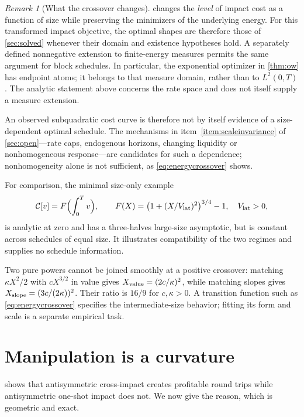 \documentclass[11pt]{article}
\numberwithin{equation}{section}
\theoremstyle{definition}
\theoremstyle{remark}
\newtheorem{remark}[theorem]{Remark}
\theoremstyle{definition}
\begin{document}
\begin{remark}[What the crossover changes]\label{rem:tworegimes}
 changes the \emph{level} of impact cost as a function
of size while preserving the minimizers of the underlying energy. For this
transformed impact objective, the optimal shapes are therefore those of
\cref{sec:solved} whenever their domain and existence hypotheses hold.
A separately defined nonnegative extension to finite-energy measures permits
the same argument for block schedules. In particular, the exponential
optimizer in \cref{thm:ow} has endpoint atoms; it belongs to that measure
domain, rather than to $L^2(0,T)$. The analytic statement above concerns the
rate space and does not itself supply a measure extension.

An observed subquadratic cost curve is therefore not by itself evidence of a
size-dependent optimal schedule. The mechanisms in item~\ref{item:scaleinvariance}
of \cref{sec:open}---rate caps, endogenous horizons, changing liquidity or
nonhomogeneous response---are candidates for such a dependence; nonhomogeneity
alone is not sufficient, as \eqref{eq:energycrossover} shows.

For comparison, the minimal size-only example
\begin{equation}\label{eq:crossoverexample}
 \mathcal C[v]=F\Bigl(\int_0^Tv\Bigr),\qquad
 F(X)=\bigl(1+(X/V_{\rm lat})^2\bigr)^{3/4}-1,\quad V_{\rm lat}>0,
\end{equation}
is analytic at zero and has a three-halves large-size asymptotic, but is
constant across schedules of equal size. It illustrates compatibility of the
two regimes and supplies no schedule information.

Two pure powers cannot be joined smoothly at a positive crossover:
matching $\kappa X^2/2$ with $cX^{3/2}$ in value gives
$X_{\rm value}=(2c/\kappa)^2$, while matching slopes gives
$X_{\rm slope}=(3c/(2\kappa))^2$. Their ratio is $16/9$ for $c,\kappa>0$.
A transition function such as \eqref{eq:energycrossover} specifies the
intermediate-size behavior; fitting its form and scale is a separate
empirical task.
\end{remark}

\section{Manipulation is a curvature}\label{sec:curvature}

 shows that antisymmetric cross-impact creates profitable round
trips while antisymmetric one-shot impact does not. We now give the reason,
which is geometric and exact.
\end{document}
